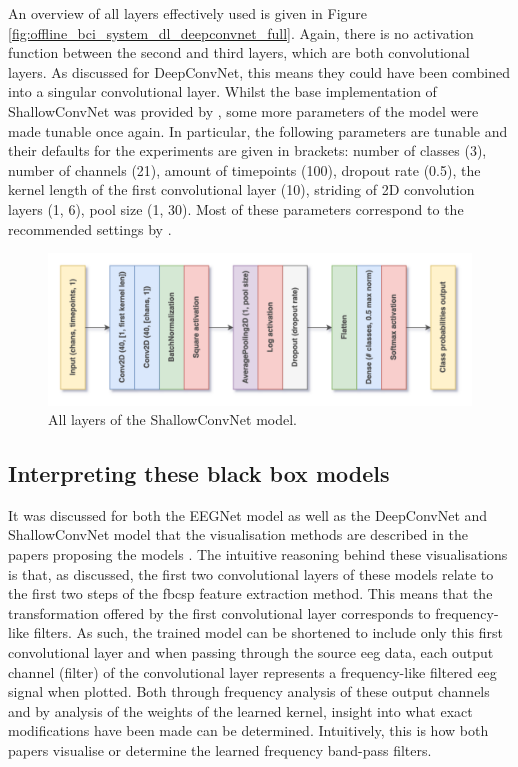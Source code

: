 An overview of all layers effectively used is given in Figure \ref{fig:offline_bci_system_dl_deepconvnet_full}.
Again, there is no activation function between the second and third layers, which are both convolutional layers.
As discussed for DeepConvNet, this means they could have been combined into a singular convolutional layer. 
Whilst the base implementation of ShallowConvNet was provided by \citet{arl_eegmodels}, some more parameters of the model were made tunable once again.
In particular, the following parameters are tunable and their defaults for the experiments are given in brackets: number of classes (3), number of channels (21), amount of timepoints (100), dropout rate (0.5), the kernel length of the first convolutional layer (10), striding of 2D convolution layers (1, 6), pool size (1, 30).
Most of these parameters correspond to the recommended settings by \citet{eeg_model_hbm}.

\begin{figure}[t]
    \centering
    \includegraphics[width=\linewidth]{../images/pipeline/shallowconvnet_full.pdf}
    \captionsetup{width=0.8\linewidth}
    \captionsetup{justification=centering}
    \caption{All layers of the ShallowConvNet model.}
    \label{fig:shallowconvnet_full}
\end{figure}


\subsection{Interpreting these black box models}
\label{subsec:offline_bci_system_one_step_dl_interpreting}

It was discussed for both the EEGNet model as well as the DeepConvNet and ShallowConvNet model that the visualisation methods are described in the papers proposing the models \citep{eeg_model_eegnet,eeg_model_hbm}.
The intuitive reasoning behind these visualisations is that, as discussed, the first two convolutional layers of these models relate to the first two steps of the \gls{fbcsp} feature extraction method.
This means that the transformation offered by the first convolutional layer corresponds to frequency-like filters.
As such, the trained model can be shortened to include only this first convolutional layer and when passing through the source \gls{eeg} data, each output channel (filter) of the convolutional layer represents a frequency-like filtered \gls{eeg} signal when plotted.
Both through frequency analysis of these output channels and by analysis of the weights of the learned kernel, insight into what exact modifications have been made can be determined.
Intuitively, this is how both papers visualise or determine the learned frequency band-pass filters.

